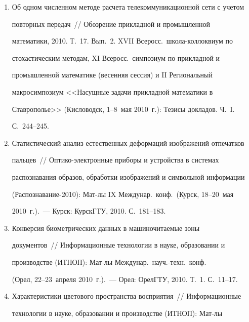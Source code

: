   \noindent


  \begin{enumerate}[1.]


\item{}


Об одном численном методе расчета телекоммуникационной сети с учетом 


повторных передач~/\!\!/  Обозрение прикладной и промышленной 


математики, 2010. Т.~17. Вып.~2. XVII Всеросс.\ школа-кол\-лок\-ви\-ум по 


стохастическим методам, XI Всеросс.\ симпозиум по прикладной и 


промышленной математике (весенняя сессия) и II Региональный 


макросимпозиум <<Насущные задачи прикладной математики в 


Ставрополье>> (Кисловодск, 1--8~мая 2010~г.): Тезисы докладов. Ч.~I. 


С.~244--245.


\item{}


Статистический анализ естественных деформаций изображений отпечатков 


пальцев~/\!\!/  Оптико-элек\-т\-рон\-ные приборы и устройства в сис\-темах 


распознавания образов, обработки изображений и символьной информации 


(Распознавание-2010): Мат-лы IX Междунар.\ конф.\ (Курск, 18--20~мая 


2010~г.).~--- Курск: КурскГТУ, 2010. С.~181--183.


\item{}


Конверсия биометрических данных в машиночитаемые зоны 


документов~/\!\!/  Информационные технологии в науке, образовании и 


производстве (ИТНОП): Мат-лы Междунар.\ науч.-техн.\ конф.\ 


(Орел, 22--23~апреля 2010~г.).~--- Орел: ОрелГТУ, 2010. Т.~1. С.~11--17.


\item{}


Характеристики цветового пространства восприятия~/\!\!/  Информационные 


технологии в науке, образовании и производстве (ИТНОП): Мат-лы 



\end{enumerate}

